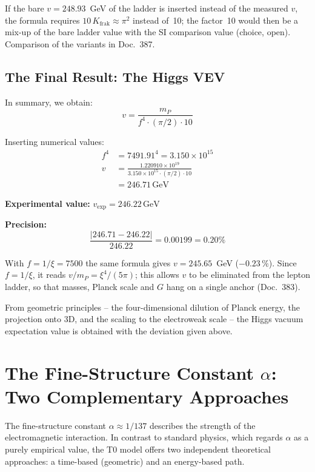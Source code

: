 	If the bare $v=248.93$~GeV of the ladder is inserted instead of the measured $v$, the formula requires $10\,K_{\text{frak}}\approx\pi^2$ instead of~10; the factor~10 would then be a mix-up of the bare ladder value with the SI comparison value (choice, open). Comparison of the variants in Doc.~387.
	
	\subsection{The Final Result: The Higgs VEV}
	
	In summary, we obtain:
	\begin{equation}
		\boxed{v = \frac{m_P}{f^4 \cdot (\pi/2) \cdot 10}}
	\end{equation}
	
	Inserting numerical values:
	\begin{align}
		f^4 &= 7491.91^4 = 3.150 \times 10^{15} \\
		v &= \frac{1.220910 \times 10^{19}}{3.150 \times 10^{15} \cdot (\pi/2) \cdot 10} \\
		&= 246.71\,\text{GeV}
	\end{align}
	
	\textbf{Experimental value:} \(v_{\exp} = 246.22\,\text{GeV}\)
	
	\textbf{Precision:}
	\begin{equation}
		\frac{|246.71 - 246.22|}{246.22} = 0.00199 = 0.20\%
	\end{equation}

	With $f = 1/\xi = 7500$ the same formula gives $v = 245.65$~GeV ($-0.23\,\%$). Since $f = 1/\xi$, it reads $v/m_P = \xi^4/(5\pi)$; this allows $v$ to be eliminated from the lepton ladder, so that masses, Planck scale and $G$ hang on a single anchor (Doc.~383).
	
	From geometric principles -- the four-dimensional dilution of Planck energy, the projection onto 3D, and the scaling to the electroweak scale -- the Higgs vacuum expectation value is obtained with the deviation given above.
	\section{The Fine-Structure Constant \(\alpha\): Two Complementary Approaches}
	
	The fine-structure constant \(\alpha \approx 1/137\) describes the strength of the electromagnetic interaction. In contrast to standard physics, which regards \(\alpha\) as a purely empirical value, the T0 model offers two independent theoretical approaches: a time-based (geometric) and an energy-based path.
	
